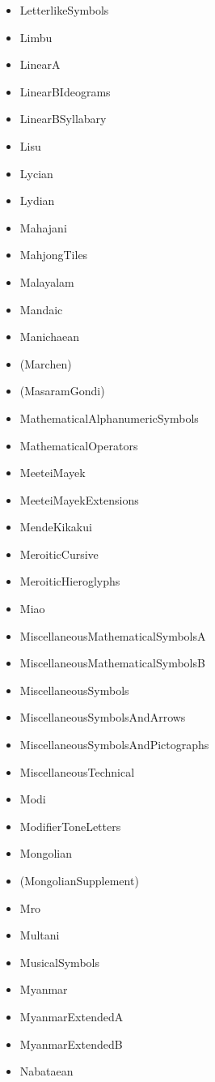 ﻿\documentclass{article}
\newenvironment{itemlist}{%
  \begin{itemize}
	\setlength{\itemsep}{0pt}
	\setlength{\parsep}{0pt}
	\setlength{\topsep}{0pt}
	\setlength{\partopsep}{0pt}
	\setlength{\parskip}{0pt}
	\setlength{\labelsep}{5pt}}%
{
  \end{itemize}}
\begin{document}
\begin{multicols}{2}
\begin{itemlist}
				\item LetterlikeSymbols
				\item Limbu
				\item LinearA
				\item LinearBIdeograms
				\item LinearBSyllabary
				\item Lisu
				\item Lycian
				\item Lydian
				\item Mahajani
				\item MahjongTiles
				\item Malayalam
				\item Mandaic
				\item Manichaean
				\item (Marchen)
				\item (MasaramGondi)
				\item MathematicalAlphanumericSymbols
				\item MathematicalOperators
				\item MeeteiMayek
				\item MeeteiMayekExtensions
				\item MendeKikakui
				\item MeroiticCursive
				\item MeroiticHieroglyphs
				\item Miao
				\item MiscellaneousMathematicalSymbolsA
				\item MiscellaneousMathematicalSymbolsB
				\item MiscellaneousSymbols
				\item MiscellaneousSymbolsAndArrows
				\item MiscellaneousSymbolsAndPictographs
				\item MiscellaneousTechnical
				\item Modi
				\item ModifierToneLetters
				\item Mongolian
				\item (MongolianSupplement)
				\item Mro
				\item Multani
				\item MusicalSymbols
				\item Myanmar
				\item MyanmarExtendedA
				\item MyanmarExtendedB
				\item Nabataean

\end{itemlist}
\end{multicols}
\end{document}
